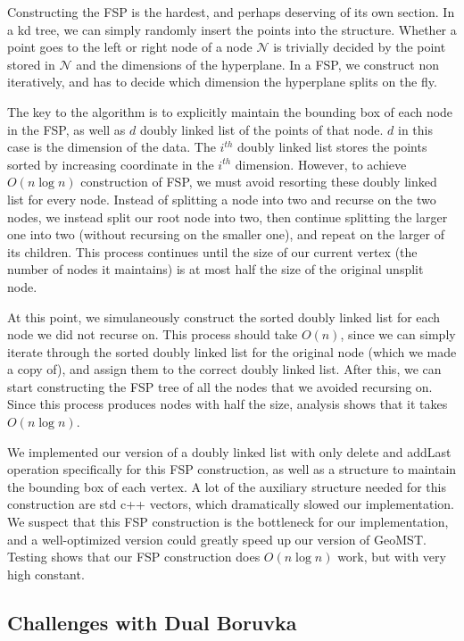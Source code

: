 \documentclass[11pt]{article}
\begin{document}
Constructing the FSP is the hardest, and perhaps deserving of its own section. In a kd tree, we can simply randomly insert the points into the structure. Whether a point goes to the left or right node of a node $\mathcal{N}$ is trivially decided by the point stored in $\mathcal{N}$ and the dimensions of the hyperplane. In a FSP, we construct non iteratively, and has to decide which dimension the hyperplane splits on the fly. 

The key to the algorithm is to explicitly maintain the bounding box of each node in the FSP, as well as $d$ doubly linked list of the points of that node. $d$ in this case is the dimension of the data. The $i^{th}$ doubly linked list stores the points sorted by increasing coordinate in the $i^{th}$ dimension. However, to achieve $O(n\log{n})$ construction of FSP, we must avoid resorting these doubly linked list for every node. Instead of splitting a node into two and recurse on the two nodes, we instead split our root node into two, then continue splitting the larger one into two (without recursing on the smaller one), and repeat on the larger of its children. This process continues until the size of our current vertex (the number of nodes it maintains) is at most half the size of the original unsplit node. 

At this point, we simulaneously construct the sorted doubly linked list for each node we did not recurse on. This process should take $O(n)$, since we can simply iterate through the sorted doubly linked list for the original node (which we made a copy of), and assign them to the correct doubly linked list. After this, we can start constructing the FSP tree of all the nodes that we avoided recursing on. Since this process produces nodes with half the size, analysis shows that it takes $O(n\log{n})$. 

We implemented our version of a doubly linked list with only delete and addLast operation specifically for this FSP construction, as well as a structure to maintain the bounding box of each vertex. A lot of the auxiliary structure needed for this construction are std c++ vectors, which dramatically slowed our implementation. We suspect that this FSP construction is the bottleneck for our implementation, and a well-optimized version could greatly speed up our version of GeoMST. Testing shows that our FSP construction does $O(n\log{n})$ work, but with very high constant.

\subsection{Challenges with Dual Boruvka}
\end{document}
